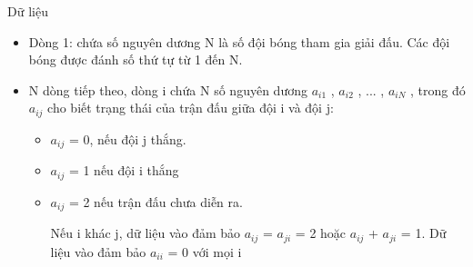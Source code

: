 Dữ liệu
\begin{itemize}
	\item     Dòng 1: chứa số nguyên dương N là số đội bóng tham gia giải đấu. Các đội bóng được đánh số thứ tự từ 1 đến N.   
	\item     N dòng tiếp theo, dòng i chứa N số nguyên dương $a_{i1}$    , $a_{i2}$    , ... , $a_{iN}$    , trong đó $a_{ij}$    cho biết trạng thái của trận đấu giữa đội i và đội j:    
\begin{itemize}
	\item       $a_{ij}$      = 0, nếu đội j thắng.     
	\item       $a_{ij}$      = 1 nếu đội i thắng     
	\item       $a_{ij}$      = 2 nếu trận đấu chưa diễn ra.      

       Nếu i khác j, dữ liệu vào đảm bảo $a_{ij}$       = $a_{ji}$       = 2 hoặc $a_{ij}$       + $a_{ji}$       = 1. Dữ liệu vào đảm bảo $a_{ii}$       = 0 với mọi i      
\end{itemize}
\end{itemize}